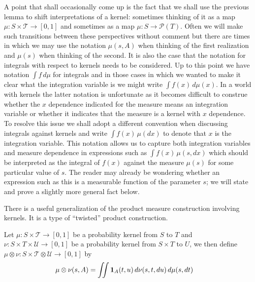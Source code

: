 A point that shall occasionally come up is the fact that we shall use
the previous lemma to shift interpretations of a kernel: sometimes
thinking of it as a map $\mu : S \times \mathcal{T} \to [0,1]$ and
sometimes as a map $\mu : S \to \mathcal{P}(T)$.  Often we will make
such transitions between these perspectives without  comment but there
are times in which we may use the notation $\mu(s,A)$ when thinking of
the first realization and $\mu(s)$ when thinking of the second.  It is
also the case that the notation for integrals with respect to kernels
needs to be considered.  Up to this point we have notation $\int f \,
d\mu$ for integrals and in those cases in which we wanted to make it
clear what the integration variable is we might write $\int f(x) \,
d\mu(x)$.  In a world with kernels the latter notation is unfortunate
as it becomes difficult to construe whether the $x$ dependence indicated
for the measure means an integration variable or whether it
indicates that the measure is a kernel with $x$ dependence.  To resolve
this issue we shall adopt a different convention when discussing
integrals against kernels and write $\int f(x) \, \mu(dx)$ to denote
that $x$ is the integration variable.  This notation allows us to
capture both integration variables and measure dependence in
expressions such as $\int f(x) \, \mu(s, dx)$ which should be
interpreted as the integral of $f(x)$ against the measure $\mu(s)$ for
some particular value of $s$.  The reader may already be wondering
whether an expression such as this is a measurable function of the
parameter $s$; we will state and prove a slightly more general
fact below.

There is a useful generalization of the product measure construction
involving kernels.  It is a type of ``twisted'' product construction.
\begin{defn}Let $\mu : S \times \mathcal{T} \to [0,1]$ be a
  probability kernel from $S$ to $T$ and $\nu : S \times T \times
  \mathcal{U} \to [0,1]$ be a probability kernel from $S \times T$ to
  $U$, we then define $\mu \otimes \nu : S \times \mathcal{T} \otimes
  \mathcal{U} \to [0,1]$ by
\begin{align*}
\mu \otimes \nu(s, A) &= \iint \textbf{1}_{A}(t,u) \,
d\nu(s,t,du) \, d\mu(s, dt)
\end{align*}
\end{defn}

